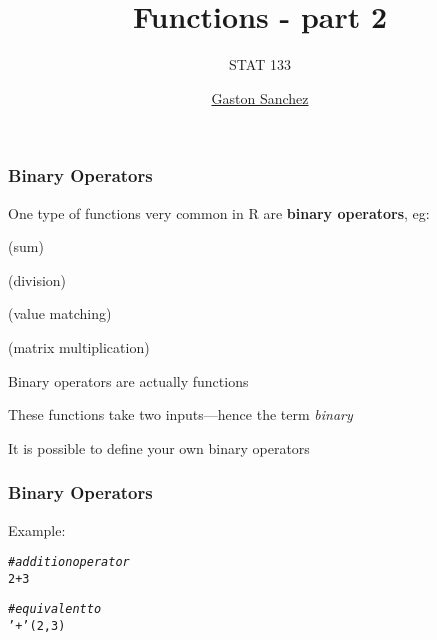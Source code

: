 \documentclass[12pt]{beamer}\usepackage[]{graphicx}\usepackage[]{color}
\title{Functions - part 2}
\subtitle{STAT 133}
\author{\href{http://www.gastonsanchez.com}{Gaston Sanchez}}
\institute{\href{https://github.com/ucb-stat133/stat133-fall-2016}{\tt \scriptsize \color{foreground} github.com/ucb-stat133/stat133-fall-2016}}
\date{}
\makeatletter
\newcommand{\hlnum}[1]{\textcolor[rgb]{0.686,0.059,0.569}{#1}}%
\newcommand{\hlstr}[1]{\textcolor[rgb]{0.192,0.494,0.8}{#1}}%
\newcommand{\hlcom}[1]{\textcolor[rgb]{0.678,0.584,0.686}{\textit{#1}}}%
\newcommand{\hlopt}[1]{\textcolor[rgb]{0,0,0}{#1}}%
\newcommand{\hlstd}[1]{\textcolor[rgb]{0.345,0.345,0.345}{#1}}%
\newenvironment{kframe}{%
 \def\at@end@of@kframe{}%
 \ifinner\ifhmode%
  \def\at@end@of@kframe{\end{minipage}}%
  \begin{minipage}{\columnwidth}%
 \fi\fi%
 \def\FrameCommand##1{\hskip\@totalleftmargin \hskip-\fboxsep
 \colorbox{shadecolor}{##1}\hskip-\fboxsep
     \hskip-\linewidth \hskip-\@totalleftmargin \hskip\columnwidth}%
 \MakeFramed {\advance\hsize-\width
   \@totalleftmargin\z@ \linewidth\hsize
   \@setminipage}}%
 {\par\unskip\endMakeFramed%
 \at@end@of@kframe}
\newenvironment{knitrout}{}{} %
\makeatother
\begin{document}
{
  \frame{
    \titlepage
  } 
}



\begin{frame}
\begin{center}
\Huge{}
\end{center}
\end{frame}


\begin{frame}
\frametitle{Binary Operators}

\bi
  \item One type of functions very common in R are \textbf{binary operators}, eg:
  \bi
    \item {} (sum)
    \item {} (division)
    \item {} (value matching)
    \item {} (matrix multiplication)
  \ei
  \item Binary operators are actually functions
  \item These functions take two inputs---hence the term \textit{binary}
  \item It is possible to define your own binary operators
\ei

\end{frame}


\begin{frame}[fragile]
\frametitle{Binary Operators}

Example:
\begin{knitrout}\footnotesize
{}\color{fgcolor}\begin{kframe}
\begin{alltt}
\hlcom{# addition operator}
\hlnum{2} \hlopt{+} \hlnum{3}

\hlcom{# equivalent to}
\hlstr{'+'}\hlstd{(}\hlnum{2}\hlstd{,} \hlnum{3}\hlstd{)}
\end{alltt}
\end{kframe}
\end{knitrout}

\end{frame}

\end{document}
